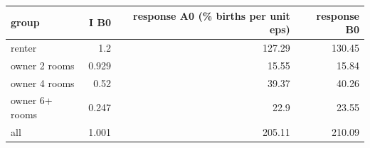 \begin{tabular}{lrrr}
\toprule
group & I B0 & response A0 (\% births per unit eps) & response B0 \\
\midrule
renter & 1.2 & 127.29 & 130.45 \\
owner 2 rooms & 0.929 & 15.55 & 15.84 \\
owner 4 rooms & 0.52 & 39.37 & 40.26 \\
owner 6+ rooms & 0.247 & 22.9 & 23.55 \\
all & 1.001 & 205.11 & 210.09 \\
\bottomrule
\end{tabular}
